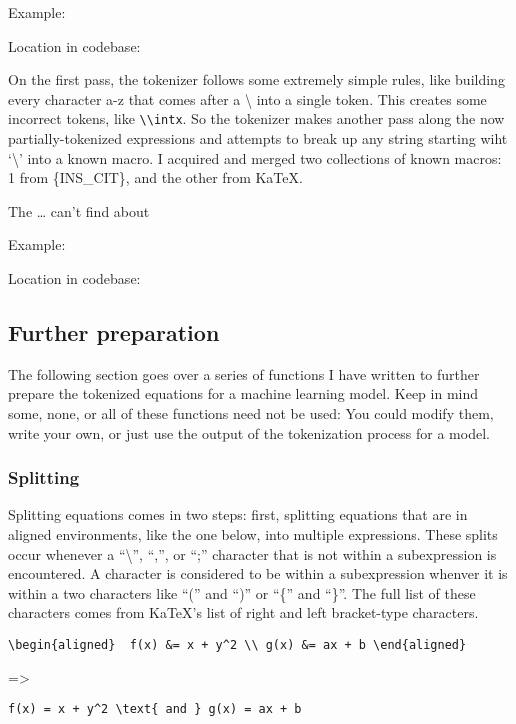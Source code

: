 \documentclass[]{article}
\begin{document}
Example:

Location in codebase:

On the first pass, the tokenizer follows some extremely simple rules,
like building every character a-z that comes after a \textbackslash{}
into a single token. This creates some incorrect tokens, like
\texttt{\textbackslash{}\textbackslash{}intx}. So the tokenizer makes
another pass along the now partially-tokenized expressions and attempts
to break up any string starting wiht `\textbackslash{}' into a known
macro. I acquired and merged two collections of known macros: 1 from
\{INS\_CIT\}, and the other from KaTeX.

The \ldots{} can't find about

Example:

Location in codebase:

\hypertarget{further-preparation}{%
\subsection{Further preparation}\label{further-preparation}}

The following section goes over a series of functions I have written to
further prepare the tokenized equations for a machine learning model.
Keep in mind some, none, or all of these functions need not be used: You
could modify them, write your own, or just use the output of the
tokenization process for a model.

\hypertarget{splitting}{%
\subsubsection{Splitting}\label{splitting}}

Splitting equations comes in two steps: first, splitting equations that
are in aligned environments, like the one below, into multiple
expressions. These splits occur whenever a ``\textbackslash{}'', ``,'',
or ``;'' character that is not within a subexpression is encountered. A
character is considered to be within a subexpression whenver it is
within a two characters like ``('' and ``)'' or ``\{'' and ``\}''. The
full list of these characters comes from KaTeX's list of right and left
bracket-type characters.

\texttt{\textbackslash{}begin\{aligned\}\ \ f(x)\ \&=\ x\ +\ y\^{}2\ \textbackslash{}\textbackslash{}\ g(x)\ \&=\ ax\ +\ b\ \textbackslash{}end\{aligned\}}

=\textgreater{}

\texttt{f(x)\ =\ x\ +\ y\^{}2\ \textbackslash{}text\{\ and\ \}\ g(x)\ =\ ax\ +\ b}
\end{document}
